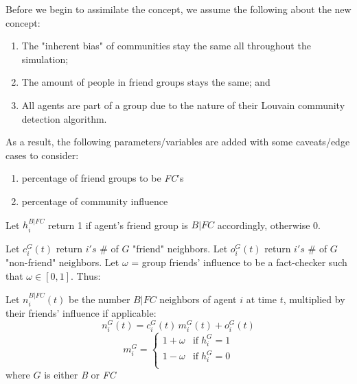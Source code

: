 \documentclass{article}
\begin{document}
Before we begin to assimilate the concept, we assume the following about the new concept:
\begin{enumerate}
  \item The "inherent bias" of communities stay the same all throughout the simulation;
  \item The amount of people in friend groups stays the same; and
  \item All agents are part of a group due to the nature of their
    Louvain community detection algorithm.
\end{enumerate}

\begin{sloppypar}
  As a result, the following parameters/variables are added
with some caveats/edge cases to consider:
\end{sloppypar}
\begin{enumerate}
  \item percentage of friend groups to be \textit{FC}'s
  \item percentage of community influence
\end{enumerate}

%

Let $h_i^{B|FC}$ return 1 if agent's friend group is $B|FC$ accordingly, otherwise 0. 

Let $c_i^G(t)$ return $i's$ \# of $G$ "friend" neighbors. Let $o_i^G(t)$ return $i's$ \# of $G$ "non-friend" neighbors. Let $\omega$ = group friends' influence to be a fact-checker such that $\omega \in [0,1]$. Thus:

Let $n_i^{B|FC}(t)$ be the number $B|FC$ neighbors of agent $i$ at time $t$,
multiplied by their friends' influence if applicable:
\[ n_i^G(t)=c_i^G(t)\,m_i^G(t)+o_i^G(t) \]
\[
  m_i^G= 
  \begin{cases}
    1 + \omega & \text{if}\; h_i^G = 1 \\
    1 - \omega & \text{if}\; h_i^G = 0 \\
  \end{cases} \]
where $G$ is either \textit{B} or \textit{FC}
\end{document}
